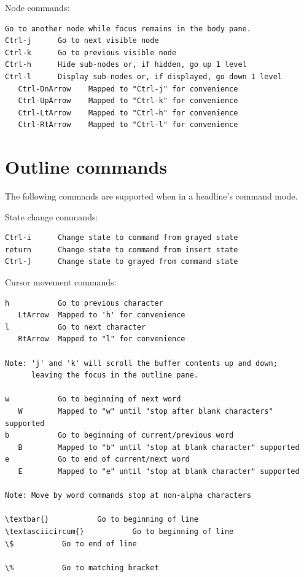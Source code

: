 \documentclass[a4paper,10pt,english]{sphinxmanual}
\begin{document}
Node commands:

\begin{Verbatim}[commandchars=\\\{\}]
Go to another node while focus remains in the body pane.
Ctrl-j      Go to next visible node
Ctrl-k      Go to previous visible node
Ctrl-h      Hide sub-nodes or, if hidden, go up 1 level
Ctrl-l      Display sub-nodes or, if displayed, go down 1 level
   Ctrl-DnArrow    Mapped to "Ctrl-j" for convenience
   Ctrl-UpArrow    Mapped to "Ctrl-k" for convenience
   Ctrl-LtArrow    Mapped to "Ctrl-h" for convenience
   Ctrl-RtArrow    Mapped to "Ctrl-l" for convenience
\end{Verbatim}


\section{Outline commands}
\label{vimBindings:outline-commands}
The following commands are supported when in a headline's command mode.

State change commands:

\begin{Verbatim}[commandchars=\\\{\}]
Ctrl-i      Change state to command from grayed state
return      Change state to command from insert state
Ctrl-]      Change state to grayed from command state
\end{Verbatim}

Cursor movement commands:

\begin{Verbatim}[commandchars=\\\{\}]
h           Go to previous character
   LtArrow  Mapped to 'h' for convenience
l           Go to next character
   RtArrow  Mapped to "l" for convenience

Note: 'j' and 'k' will scroll the buffer contents up and down;
      leaving the focus in the outline pane.

w           Go to beginning of next word
   W        Mapped to "w" until "stop after blank characters" supported
b           Go to beginning of current/previous word
   B        Mapped to "b" until "stop at blank character" supported
e           Go to end of current/next word
   E        Mapped to "e" until "stop at blank character" supported

Note: Move by word commands stop at non-alpha characters

\textbar{}           Go to beginning of line
\textasciicircum{}           Go to beginning of line
\$           Go to end of line

\%           Go to matching bracket
\end{Verbatim}
\end{document}
